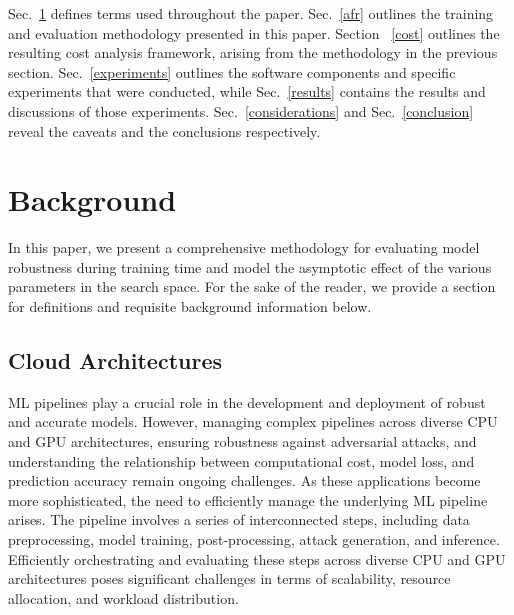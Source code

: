 \documentclass[conference]{IEEEtran}
\begin{document}
Sec.~\ref{background} defines terms used throughout the paper. Sec.~\ref{afr} outlines the training and evaluation methodology presented in this paper.  Section ~\ref{cost} outlines the resulting cost analysis framework, arising from the methodology in the previous section. Sec.~\ref{experiments} outlines the software components and specific experiments that were conducted, while Sec.~\ref{results} contains the results and discussions of those experiments. Sec.~\ref{considerations} and Sec.~\ref{conclusion} reveal the caveats and the conclusions respectively.


\section{Background}
\label{background}



In this paper, we present a comprehensive methodology for evaluating model robustness during training time and model the asymptotic effect of the various parameters in the search space. For the sake of the reader, we provide a section for definitions and requisite background information below.


\subsection{Cloud Architectures}


ML pipelines play a crucial role in the development and deployment of robust and accurate models. However, managing complex pipelines across diverse CPU and GPU architectures, ensuring robustness against adversarial attacks, and understanding the relationship between computational cost, model loss, and prediction accuracy remain ongoing challenges.
As these applications become more sophisticated, the need to efficiently manage the underlying ML pipeline arises. The pipeline involves a series of interconnected steps, including data preprocessing, model training, post-processing, attack generation, and inference. Efficiently orchestrating  and evaluating these steps across diverse CPU and GPU architectures poses significant challenges in terms of scalability, resource allocation, and workload distribution. 
\end{document}
